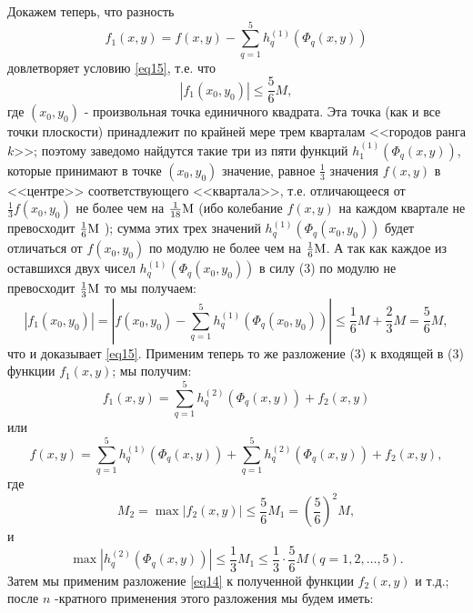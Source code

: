 \documentclass[12pt, twoside]{article}
\theoremstyle{definition}
\begin{document}
Докажем теперь, что разность 
\begin{equation}\label{eq17}
f_1(x,y)=f(x,y)-\sum\limits_{q=1}^5 {h_q^{(1)}(\Phi_q(x,y))} 
\end{equation}
довлетворяет условию \eqref{eq15}, т.е. что
\begin{equation}\label{eq18}
\left|{f_1 (x_0 ,y_0 )} \right|\le \frac{5}{6}M,
\end{equation}
где $(x_0,y_0)$ - произвольная точка единичного квадрата.  Эта точка (как и все точки плоскости) принадлежит по крайней мере трем кварталам <<городов ранга $k$>>; поэтому заведомо найдутся такие три из пяти функций $h_1^{(1)}(\Phi_q (x,y))$, которые принимают в точке $(x_0 ,y_0 )$ значение, равное ${\frac{1}{3}}$ значения $f(x,y)$ в <<центре>> соответствующего <<квартала>>, т.е. отличающееся от ${\frac{1}{3}}{f(x_0 ,y_0 )}$ не более чем на ${\frac{1}{18}}{\rm{M}}$ (ибо колебание $f(x,y)$ на каждом квартале не превосходит ${\frac{1}{6}}{\rm{M}}$ ); сумма этих трех значений $h_q^{(1)} (\Phi_q (x_0 ,y_0 ))$ будет отличаться от $f(x_0 ,y_0 )$ по модулю не более чем на ${\frac{1}{6}}{\rm{M}}$. А так как каждое из оставшихся двух чисел $h_q^{(1)} (\Phi_q (x_0 ,y_0 ))$ в силу (3) по модулю не превосходит ${\frac{1}{3}}{\rm{M}}$ то мы получаем:
\begin{equation}\label{eq19}
\left|{f_1 (x_0 ,y_0 )} \right|=\left|{f(x_0 ,y_0 )-\sum\limits_{q=1}^5 {h_q^{(1)}(\Phi_q (x_0 ,y_0 ))}}\right|\leq\frac{1}{6}M+\frac{2}{3}M=\frac{5}{6}M ,
\end{equation}
что и доказывает \eqref{eq15}.
Применим теперь то же разложение (3) к входящей в (3) функции $f_1 (x,y)$; мы получим:
\begin{equation}\label{eq20}
f_1(x,y)=\sum\limits_{q=1}^5 {h_q^{(2)} (\Phi_q (x,y))+f_2 (x,y)} 
\end{equation}
или
\begin{equation}\label{eq21}
f(x,y)=\sum\limits_{q=1}^5 {h_q^{(1)} (\Phi_q (x,y))}+\sum\limits_{q=1}^5 {h_q^{(2)} (\Phi_q (x,y))}+f_2 (x,y),
\end{equation}
где
\begin{equation}\label{eq22}
M_2 =\max \left|{f_2 (x,y)} \right|\le \frac{5}{6}M_1 =\left( {\frac{5}{6}} \right)^2 M,
\end{equation}
и
\begin{equation}\label{eq22}
\max \left|{h_q^{(2)} (\Phi_q (x,y))} \right|\leq \frac{1}{3}M_1 \leq \frac{1}{3} \cdot \frac{5}{6}M
(q=1,2,\dots,5 ).
\end{equation}
Затем мы применим разложение \eqref{eq14} к полученной функции $f_2(x,y)$ и т.д.; после $n$ -кратного применения этого разложения мы будем иметь:
\end{document}
